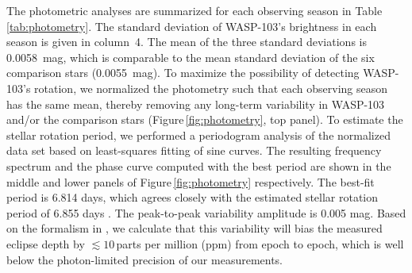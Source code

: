 \documentclass[twocolumn]{aastex61}
\begin{document}
The photometric analyses are summarized for each observing season in Table\,\ref{tab:photometry}.  The standard deviation of WASP-103's brightness in each season is given in column~4.  The mean of the three standard deviations is 0.0058~mag, which is comparable to the mean standard deviation of the six comparison stars (0.0055~mag).  To maximize the possibility of detecting WASP-103's rotation, we normalized the photometry such that each observing season has the same mean, thereby removing any long-term variability in WASP-103 and/or the comparison stars (Figure\,\ref{fig:photometry}, top panel).  To estimate the stellar rotation period, we performed a periodogram analysis of the normalized data set based on least-squares fitting of sine curves.  The resulting frequency spectrum and the phase curve computed with the best period are shown in the middle and lower panels of Figure\,\ref{fig:photometry} respectively. The best-fit period is 6.814 days, which agrees closely with the estimated stellar rotation period of 6.855 days \citep[based on the projected stellar rotation velocity reported in][]{gillon14}. The peak-to-peak variability amplitude is 0.005 mag.  Based on the formalism in \cite{zellem17}, we calculate that this variability will bias the measured eclipse depth by $\lesssim10$\,parts per million (ppm) from epoch to epoch, which is well below the photon-limited precision of our measurements.
\end{document}
